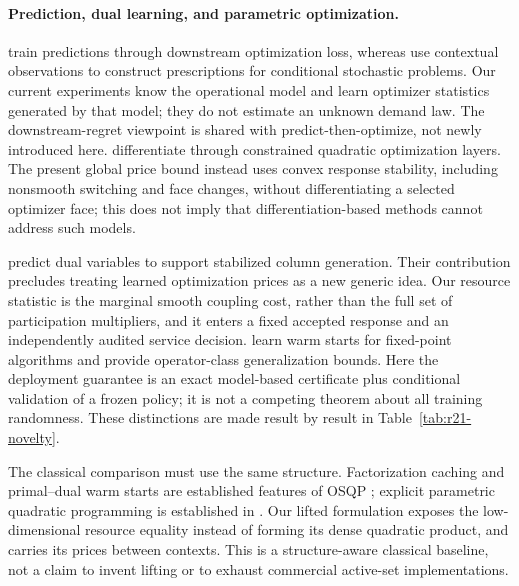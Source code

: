 \paragraph{Prediction, dual learning, and parametric optimization.}
\citet{ElmachtoubGrigas2022} train predictions through downstream optimization loss, whereas \citet{BertsimasKallus2020} use contextual observations to construct prescriptions for conditional stochastic problems. Our current experiments know the operational model and learn optimizer statistics generated by that model; they do not estimate an unknown demand law. The downstream-regret viewpoint is shared with predict-then-optimize, not newly introduced here. \citet{AmosKolter2017} differentiate through constrained quadratic optimization layers. The present global price bound instead uses convex response stability, including nonsmooth switching and face changes, without differentiating a selected optimizer face; this does not imply that differentiation-based methods cannot address such models.

\citet{KraulSeizingerBrunner2023} predict dual variables to support stabilized column generation. Their contribution precludes treating learned optimization prices as a new generic idea. Our resource statistic is the marginal smooth coupling cost, rather than the full set of participation multipliers, and it enters a fixed accepted response and an independently audited service decision. \citet{Sambharya2024} learn warm starts for fixed-point algorithms and provide operator-class generalization bounds. Here the deployment guarantee is an exact model-based certificate plus conditional validation of a frozen policy; it is not a competing theorem about all training randomness. These distinctions are made result by result in Table~\ref{tab:r21-novelty}.

The classical comparison must use the same structure. Factorization caching and primal--dual warm starts are established features of OSQP \citep{Stellato2020}; explicit parametric quadratic programming is established in \citet{Bemporad2002}. Our lifted formulation exposes the low-dimensional resource equality instead of forming its dense quadratic product, and carries its prices between contexts. This is a structure-aware classical baseline, not a claim to invent lifting or to exhaust commercial active-set implementations.

